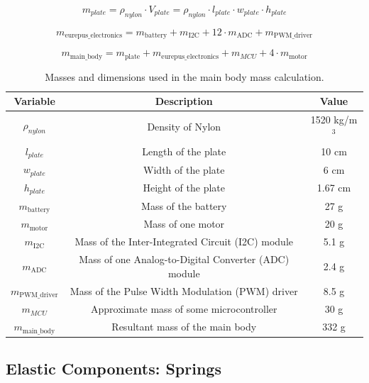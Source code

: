 \begin{equation}
\label{eq:Nylon_plate}
m_{plate} = \rho_{nylon} \cdot V_{plate} = \rho_{nylon} \cdot l_{plate} \cdot w_{plate} \cdot h_{plate}
\end{equation}

\begin{equation}
\label{eq:eurepus_electronics}
m_{\text{eurepus\_electronics}} = m_{\text{battery}} + m_{\text{I2C}} + 12 \cdot m_{\text{ADC}} + m_{\text{PWM\_driver}}
\end{equation}

\begin{equation}
\label{eq:main_body_mass}
m_{\text{main\_body}} = m_{\text{plate}} + m_{\text{eurepus\_electronics}}+m_{MCU}+ 4 \cdot m_{\text{motor}}
\end{equation}

\begin{table}
\centering
\begin{tabular}{|c|c|c|}
\hline
\textbf{Variable} & \textbf{Description} & \textbf{Value} \\
\hline
$\rho_{nylon}$ & Density of Nylon & 1520 kg/m$^3$  \\
$l_{plate}$ & Length of the plate & 10 cm \\
$w_{plate}$ & Width of the plate & 6 cm \\
$h_{plate}$ & Height of the plate & 1.67 cm \\
$m_{\text{battery}}$ & Mass of the battery & 27 g  \\
$m_{\text{motor}}$ & Mass of one motor & 20 g  \\
$m_{\text{I2C}}$ & Mass of the Inter-Integrated Circuit (I2C) module & 5.1 g  \\
$m_{\text{ADC}}$ & Mass of one Analog-to-Digital Converter (ADC) module & 2.4 g  \\
$m_{\text{PWM\_driver}}$ & Mass of the Pulse Width Modulation (PWM) driver & 8.5 g  \\
$m_{MCU}$ & Approximate mass of some microcontroller & 30 g \\
\hline
$m_{\text{main\_body}}$ & Resultant mass of the main body & 332 g \\
\hline
\end{tabular}
\caption{Masses and dimensions used in the main body mass calculation.}
\label{tab:component_masses}
\end{table}


\subsection{Elastic Components: Springs}

